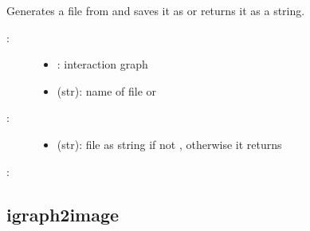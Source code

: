 \documentclass[letterpaper,10pt,english]{sphinxmanual}
\begin{document}
\begin{fulllineitems}
\label{\detokenize{InteractionGraphs:PyBoolNet.InteractionGraphs.igraph2dot}}
Generates a  file from  and saves it as  or returns it as a string.
\begin{description}
\item[{:}] \leavevmode\begin{itemize}
\item {} 
: interaction graph

\item {} 
 (str): name of  file or 

\end{itemize}

\item[{:}] \leavevmode\begin{itemize}
\item {} 
 (str): file as string if not , otherwise it returns 

\end{itemize}

\end{description}

:

\begin{sphinxVerbatim}[commandchars=\\\{\}]
 
  
\end{sphinxVerbatim}

\end{fulllineitems}



\subsection{igraph2image}
\label{\detokenize{InteractionGraphs:id6}}\label{\detokenize{InteractionGraphs:igraph2image}}
\end{document}
